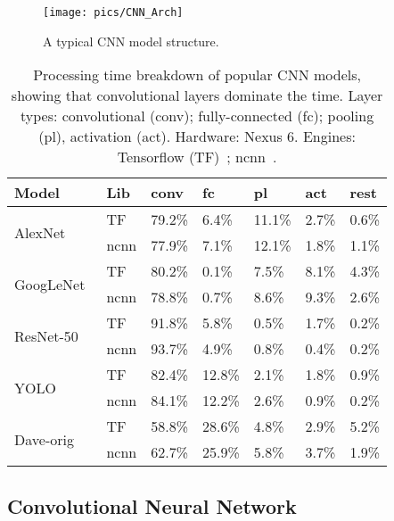 \documentclass[10pt,acmtog]{acmart}
\begin{document}
\begin{figure}[t]
	\centering
	\texttt{[image: pics/CNN\_Arch]}
	\caption{A typical CNN model structure.}
	\label{fig:CNN_Arch}
\end{figure}\begin{table}[t]
\small
\centering
\begin{tabular}{|l|l|l|l|l|l|l|}
\hline
\textbf{Model} & \textbf{Lib} & \textbf{conv} & \textbf{fc} & \textbf{pl} & \textbf{act} & \textbf{rest} \\ \hline
\multirow{2}{*}{AlexNet~\cite{alexnet}} & TF & 79.2\% & 6.4\% & 11.1\% & 2.7\% & 0.6\% \\ \cline{2-7} 
 & ncnn & 77.9\% & 7.1\% & 12.1\% & 1.8\% & 1.1\% \\ \hline
\multirow{2}{*}{GoogLeNet~\cite{Inception}} & TF & 80.2\% & 0.1\% & 7.5\% & 8.1\% & 4.3\% \\ \cline{2-7} 
 & ncnn & 78.8\% & 0.7\% & 8.6\% & 9.3\% & 2.6\% \\ \hline
\multirow{2}{*}{ResNet-50~\cite{ResNet}} & TF & 91.8\% & 5.8\% & 0.5\% & 1.7\% & 0.2\% \\ \cline{2-7} 
 & ncnn & 93.7\% & 4.9\% & 0.8\% & 0.4\% & 0.2\% \\ \hline
\multirow{2}{*}{YOLO~\cite{yolo}} & TF & 82.4\% & 12.8\% & 2.1\% & 1.8\% & 0.9\%\\ \cline{2-7}
 & ncnn & 84.1\% & 12.2\% & 2.6\% & 0.9\% & 0.2\% \\ \hline
\multirow{2}{*}{Dave-orig~\cite{bojarski2016end}} & TF & 58.8\% & 28.6\% & 4.8\% & 2.9\% & 5.2\% \\ \cline{2-7} 
 & ncnn & 62.7\% & 25.9\% & 5.8\% & 3.7\% & 1.9\% \\ \hline
\end{tabular}
\caption{Processing time breakdown of popular CNN models, showing that convolutional layers dominate the time. 
Layer types: convolutional (conv); fully-connected (fc); pooling (pl), activation (act). 
Hardware: Nexus 6. 
Engines: Tensorflow (TF)~\cite{TensorFlow}; ncnn~\cite{ncnn}.
}
\label{tab:latency_breakdown}
\end{table}\subsection{Convolutional Neural Network}\label{sec:cnn}
\end{document}
